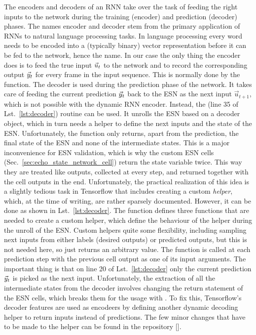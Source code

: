 The encoders and decoders of an RNN take over the task of feeding the right
inputs to the network during the training (encoder) and prediction (decoder)
phases. The names encoder and decoder stem from the primary application of RNNs to
natural language processing tasks.  In language processing every word needs to
be encoded into a (typically binary) vector representation before it can be fed
to the network, hence the name. In our case the only thing the encoder does is
to feed the true input $\vec{u}_t$ to the network and to record the corresponding
output $\vec{y}_t$ for every frame in the input sequence. This is normally done by
the  function.  The decoder is used during the
prediction phase of the network.  It takes care of feeding the current
prediction $\vec{y}_t$ back to the ESN as the next input $\vec{u}_{t+1}$, which is
not possible with the dynamic RNN encoder.  Instead, the
 (line 35 of Lst.~\ref{lst:decoder})
routine can be used. It unrolls the ESN based on a decoder object, which in
turn needs a helper to define the next inputs and the state of the ESN.
Unfortunately, the  function only returns, apart from
the prediction, the final state of the ESN and none of the intermediate states.
This is a major inconvenience for ESN validation, which is why the custom ESN
cells (Sec.~\ref{sec:echo_state_network_cell}) return the state variable twice.
This way they are treated like outputs, collected at every step, and
returned together with the cell outputs in the end.  Unfortunately, the
practical realization of this idea is a slightly tedious task in Tensorflow
that includes creating a custom \emph{helper}, which, at the time of writing,
are rather sparsely documented.  However, it can be done as shown in
Lst.~\ref{lst:decoder}. The  function defines three
functions that are needed to create a custom helper, which define the behaviour
of the helper during the unroll of the ESN.  Custom helpers quite some
flexibility, including sampling next inputs from either labels (desired
outputs) or predicted outputs, but this is not needed here, so 
just returns an arbitrary value.  The  function is called
at each prediction step with the previous cell output as one of its input
arguments.  The important thing is that on line 20 of Lst.~\ref{lst:decoder}
only the current prediction $\vec{y}_t$ is picked as the next input.
Unfortunately, the extraction of all the intermediate states from the decoder
involves changing the return statement of the ESN cells, which breaks them for
the usage with . To fix this, Tensorflow's decoder
features are used as encodeers by defining another dynamic decoding helper to
return inputs instead of predictions.  The few minor changes that have to be
made to the helper can be found in the repository [\cite{coderepo}].



